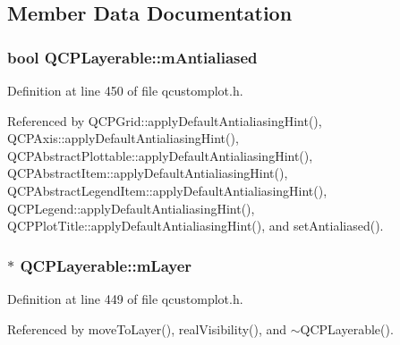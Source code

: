 \subsection{Member Data Documentation}
\hypertarget{class_q_c_p_layerable_a3ab45a4c76a3333ce42eb217a81733ec}{}
\subsubsection[{m\+Antialiased}]{\setlength{\rightskip}{0pt plus 5cm}bool Q\+C\+P\+Layerable\+::m\+Antialiased\hspace{0.3cm}{\ttfamily [protected]}}\label{class_q_c_p_layerable_a3ab45a4c76a3333ce42eb217a81733ec}


Definition at line 450 of file qcustomplot.\+h.



Referenced by Q\+C\+P\+Grid\+::apply\+Default\+Antialiasing\+Hint(), Q\+C\+P\+Axis\+::apply\+Default\+Antialiasing\+Hint(), Q\+C\+P\+Abstract\+Plottable\+::apply\+Default\+Antialiasing\+Hint(), Q\+C\+P\+Abstract\+Item\+::apply\+Default\+Antialiasing\+Hint(), Q\+C\+P\+Abstract\+Legend\+Item\+::apply\+Default\+Antialiasing\+Hint(), Q\+C\+P\+Legend\+::apply\+Default\+Antialiasing\+Hint(), Q\+C\+P\+Plot\+Title\+::apply\+Default\+Antialiasing\+Hint(), and set\+Antialiased().

\hypertarget{class_q_c_p_layerable_aa38ec5891aff0f50b36fd63e9372a0cd}{}
\subsubsection[{m\+Layer}]{$\ast$ Q\+C\+P\+Layerable\+::m\+Layer\hspace{0.3cm}{\ttfamily [protected]}}\label{class_q_c_p_layerable_aa38ec5891aff0f50b36fd63e9372a0cd}


Definition at line 449 of file qcustomplot.\+h.



Referenced by move\+To\+Layer(), real\+Visibility(), and $\sim$\+Q\+C\+P\+Layerable().

\hypertarget{class_q_c_p_layerable_a3291445a980053e2d17a21d15957624e}{}
